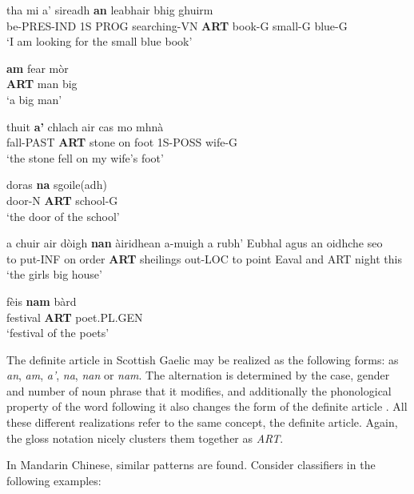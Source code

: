\documentclass[final]{ua-thesis}
\begin{document}
\begin{exe}  
\ex 
\gll tha mi a' sireadh \textbf{an} leabhair bhig ghuirm\\
be-PRES-IND 1S PROG searching-VN \textbf{ART} book-G small-G blue-G\\
\glt `I am looking for the small blue book' \citep[p. 29]{lamb2001scottish}

\ex 
\gll \textbf{am} fear m\`or\\
\textbf{ART} man big\\
\glt `a big man' \citep[p. 31]{lamb2001scottish}

\ex
\gll thuit \textbf{a'} chlach air cas mo mhn\`a\\
fall-PAST \textbf{ART} stone on foot 1S-POSS wife-G\\
\glt`the stone fell on my wife's foot' \citep[p. 30]{lamb2001scottish} 	

\ex
\gll doras \textbf{na} sgoile(adh) \\
door-N \textbf{ART} school-G \\
\glt `the door of the school' \citep[p. 29]{lamb2001scottish} 	

\ex 
\gll a chuir air d\`oigh \textbf{nan} \`airidhean a-muigh a rubh' Eubhal agus an oidhche seo \\
to put-INF on order \textbf{ART} sheilings out-LOC to point Eaval and ART night this \\
\glt `the girls big house' \citep[p. 100]{lamb2001scottish} 

\ex
\gll f\`eis \textbf{nam} b\`ard\\
festival \textbf{ART} poet.PL.GEN\\
\glt `festival of the poets' \citep[p. 107]{lamb2001scottish}

\end{exe}

The definite article in Scottish Gaelic may be realized as the following forms: as \textit{an}, \textit{am}, \textit{a'}, \textit{na}, \textit{nan} or \textit{nam}. The alternation is determined by the case, gender and number of noun phrase that it modifies, and additionally the phonological property of the word following it also changes the form of the definite article \citep{lamb2001scottish}. All these different realizations refer to the same concept, the definite article. Again, the gloss notation nicely clusters them together as \textit{ART}. 

In Mandarin Chinese, similar patterns are found. Consider classifiers in the following examples:
\end{document}
